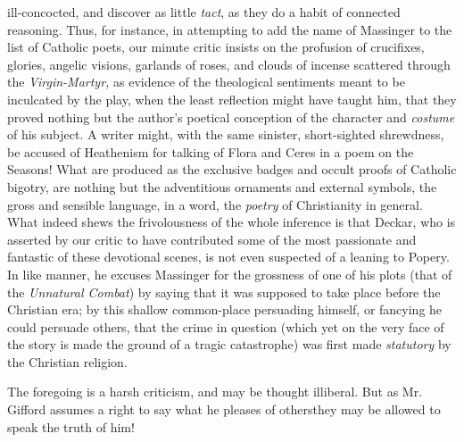 ill-concocted, and discover as little \emph{tact}, as they do a
habit of connected reasoning. Thus, for instance, in attempting to
add the name of Massinger to the list of Catholic poets, our
minute critic insists on the profusion of crucifixes, glories,
angelic visions, garlands of roses, and clouds of incense
scattered through the \emph{Virgin-Martyr,} as evidence of the
theological sentiments meant to be inculcated by the play, when
the least reflection might have taught him, that they proved
nothing but the author's poetical conception of the character and
\emph{costume} of his subject. A writer might, with the same
sinister, short-sighted shrewdness, be accused of Heathenism for
talking of Flora and Ceres in a poem on the Seasons! What are
produced as the exclusive badges and occult proofs of Catholic
bigotry, are nothing but the adventitious ornaments and external
symbols, the gross and sensible language, in a word, the
\emph{poetry} of Christianity in general. What indeed shews the
frivolousness of the whole inference is that Deckar, who is
asserted by our critic to have contributed some of the most
passionate and fantastic of these devotional scenes, is not even
suspected of a leaning to Popery. In like manner, he excuses
Massinger for the grossness of one of his plots (that of the
\emph{Unnatural Combat}) by saying that it was supposed to take
place before the Christian era; by this shallow common-place
persuading himself, or fancying he could persuade others, that the
crime in question (which yet on the very face of the story is made
the ground of a tragic catastrophe) was first made
\emph{statutory} by the Christian religion.

The foregoing is a harsh criticism, and may be thought
illiberal. But as Mr. Gifford assumes a right to say what he
pleases of others\textemdash they may be allowed to speak the
truth of him!
